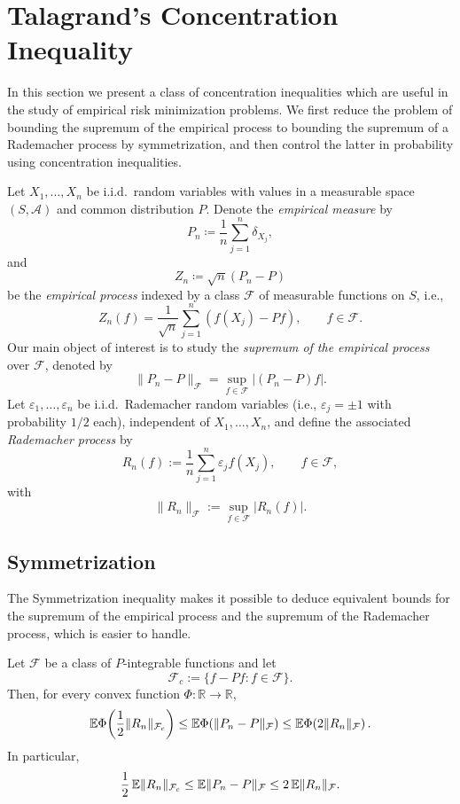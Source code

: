 \section{Talagrand's Concentration Inequality}\label{sec:talagrand}

In this section we present a class of concentration inequalities which are useful in the study of empirical risk minimization problems. We first reduce the problem of bounding the supremum of the empirical process to bounding the supremum of a Rademacher process by symmetrization, and then control the latter in probability using concentration inequalities.

\smallskip

Let $X_1,\ldots,X_n$ be i.i.d.\ random variables with values in a measurable space $(S,\mathcal A)$ and common distribution $P$. Denote the \textit{empirical measure} by
\[
  P_n \coloneqq \frac{1}{n}\sum_{j=1}^n \delta_{X_j},
\]
and
\[
  Z_n \coloneqq \sqrt{n}(P_n-P)
\]
be the \textit{empirical process} indexed by a class $\mathcal F$ of measurable functions on $S$, i.e.,
\[
  Z_n(f)=\frac{1}{\sqrt{n}}\sum_{j=1}^n (f(X_j)-P f), \qquad f\in\mathcal F.
\]
Our main object of interest is to study the \textit{supremum of the empirical process }over $\mathcal F$, denoted by
\[
  \|P_n-P\|_{\mathcal F}=\sup_{f\in\mathcal F}|(P_n-P)f|.
\]
Let $\varepsilon_1,\ldots,\varepsilon_n$ be i.i.d.\ Rademacher random variables (i.e., $\varepsilon_j=\pm 1$ with probability $1/2$ each), independent of $X_1,\ldots,X_n$, and define the associated \textit{Rademacher process} by
\[
  R_n(f):=\frac{1}{n}\sum_{j=1}^n \varepsilon_j f(X_j), \qquad f\in\mathcal F,
\]
with
\[
  \|R_n\|_{\mathcal F}:=\sup_{f\in\mathcal F}|R_n(f)|.
\]


\subsection{Symmetrization}

The Symmetrization inequality makes it possible to deduce equivalent bounds for the supremum of the empirical process and the supremum of the Rademacher process, which is easier to handle.

\begin{theorem}\label{thm:symmetrization}
  Let $\mathcal F$ be a class of $P$-integrable functions and let
  \[
    \mathcal F_c:=\{f-P f:f\in\mathcal F\}.
  \]
  Then, for every convex function $\Phi:\mathbb R\to\mathbb R$,
  \[
    \mathbb{E} \Phi\!\left(\frac12 \|R_n\|_{\mathcal F_c}\right)
    \le
    \mathbb{E} \Phi\!\left(\|P_n-P\|_{\mathcal F}\right)
    \le
    \mathbb{E} \Phi\!\left(2\|R_n\|_{\mathcal F}\right).
  \]
  In particular,
  \[
    \frac12\,\mathbb{E}\|R_n\|_{\mathcal F_c}
    \le
    \mathbb{E}\|P_n-P\|_{\mathcal F}
    \le
    2\,\mathbb{E}\|R_n\|_{\mathcal F}.
  \]
\end{theorem}

